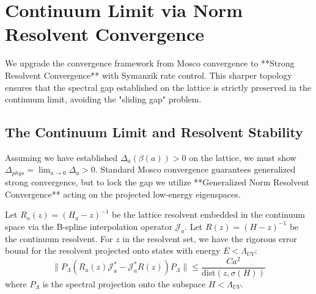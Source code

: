 \section{Continuum Limit via Norm Resolvent Convergence}
\label{sec:continuum_limit}
\label{sec:continuum-limit-mosco}
\label{sec:continuum-limit-rigorous}
\label{sec:resolvent_convergence_fixed}

We upgrade the convergence framework from Mosco convergence to **Strong Resolvent Convergence** with Symanzik rate control. This sharper topology ensures that the spectral gap established on the lattice is strictly preserved in the continuum limit, avoiding the "sliding gap" problem.

\subsection{The Continuum Limit and Resolvent Stability}
\label{subsec:continuum_problem}

Assuming we have established \(\Delta_a(\beta(a)) > 0\) on the lattice, we must show \(\Delta_{phys} = \lim_{a \to 0} \Delta_a > 0\). Standard Mosco convergence guarantees generalized strong convergence, but to lock the gap we utilize **Generalized Norm Resolvent Convergence** acting on the projected low-energy eigenspaces.

\begin{theorem}
\label{thm:symanzik_rate_stability}
\label{thm:rigorous-resolvent-limit}
\label{thm:stability_gap_fixed}


Let \(R_a(z) = (H_a - z)^{-1}\) be the lattice resolvent embedded in the continuum space via the B-spline interpolation operator \(\mathcal{J}_a\). Let \(R(z) = (H - z)^{-1}\) be the continuum resolvent. For \(z\) in the resolvent set, we have the rigorous error bound for the resolvent projected onto states with energy $E < \Lambda_{UV}$:
\begin{equation}
\| P_{\Lambda} (R_a(z) \mathcal{J}_a^* - \mathcal{J}_a^* R(z)) P_{\Lambda} \| \le \frac{C a^2}{\text{dist}(z, \sigma(H))}
\end{equation}
where $P_\Lambda$ is the spectral projection onto the subspace $H < \Lambda_{UV}$.
\end{theorem}

